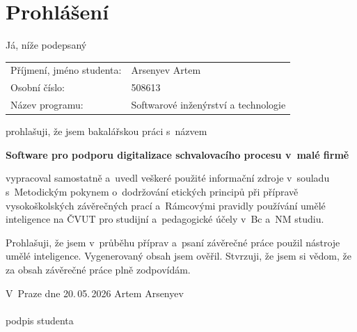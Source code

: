 \documentclass[
  a4paper,          %
  11pt,             %
  oneside,          %
  openany           %
]{report}
\begin{document}
\cleardoublepage

\chapter*{Prohlášení}
\thispagestyle{plain}

\noindent Já, níže podepsaný

\vspace{0.5cm}
\noindent\begin{tabular}{@{}p{6cm}l@{}}
Příjmení, jméno studenta: & Arsenyev Artem \\
Osobní číslo:             & 508613 \\
Název programu:           & Softwarové inženýrství a technologie \\
\end{tabular}

\vspace{0.8cm}
\noindent prohlašuji, že jsem bakalářskou práci s~názvem

\vspace{0.5cm}
\noindent\textbf{Software pro podporu digitalizace schvalovacího procesu v~malé firmě}

\vspace{0.5cm}
\noindent vypracoval samostatně a~uvedl veškeré použité informační zdroje v~souladu s~Metodickým pokynem o~dodržování etických principů při přípravě vysokoškolských závěrečných prací a~Rámcovými pravidly používání umělé inteligence na ČVUT pro studijní a~pedagogické účely v~Bc a~NM studiu.

\vspace{0.5cm}
\noindent Prohlašuji, že jsem v~průběhu příprav a~psaní závěrečné práce použil nástroje umělé inteligence. Vygenerovaný obsah jsem ověřil. Stvrzuji, že jsem si vědom, že za obsah závěrečné práce plně zodpovídám.

\vspace{2cm}
\noindent V~Praze dne 20.\,05.\,2026 \hfill Artem Arsenyev\\[0.2cm]
\hspace*{\fill} \dotfill\hspace{4cm}\\
\hspace*{\fill} podpis studenta\hspace{3cm}

\cleardoublepage

\end{document}
